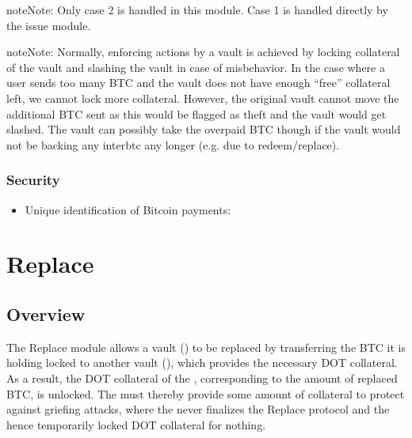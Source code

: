 \documentclass[a4paper,10pt,english]{sphinxmanual}
\begin{document}
\begin{sphinxadmonition}{note}{Note:}
Only case 2 is handled in this module. Case 1 is handled directly by the issue module.
\end{sphinxadmonition}

\begin{sphinxadmonition}{note}{Note:}
Normally, enforcing actions by a vault is achieved by locking collateral of the vault and slashing the vault in case of misbehavior. In the case where a user sends too many BTC and the vault does not have enough “free” collateral left, we cannot lock more collateral. However, the original vault cannot move the additional BTC sent as this would be flagged as theft and the vault would get slashed. The vault can possibly take the overpaid BTC though if the vault would not be backing any interbtc any longer (e.g. due to redeem/replace).
\end{sphinxadmonition}


\subsection{Security}
\label{\detokenize{spec/refund:security}}\begin{itemize}
\item {} 
Unique identification of Bitcoin payments: {\hyperref[\detokenize{security_performance/security-analysis:op-return}]{}}

\end{itemize}


\chapter{Replace}
\label{\detokenize{spec/replace:replace}}\label{\detokenize{spec/replace:replace-protocol}}\label{\detokenize{spec/replace::doc}}

\section{Overview}
\label{\detokenize{spec/replace:overview}}
The Replace module allows a vault () to be replaced by transferring the BTC it is holding locked to another vault (), which provides the necessary DOT collateral. As a result, the DOT collateral of the , corresponding to the amount of replaced BTC, is unlocked. The  must thereby provide some amount of collateral to protect against griefing attacks, where the  never finalizes the Replace protocol and the  hence temporarily locked DOT collateral for nothing.
\end{document}
